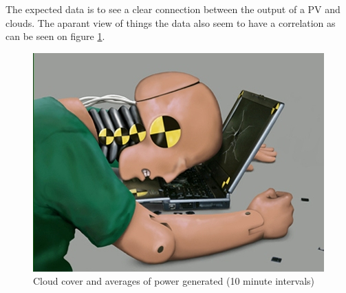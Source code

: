 The expected data is to see a clear connection between the output of a
PV and clouds\citep{southafrica}.  The aparant view of things the data
also seem to have a correlation as can be seen on figure \ref{fig:cloudsAndPower}.

\begin{figure}[h]
  \centering
  \includegraphics{dummy.jpg}
  \caption{Cloud cover and averages of power generated (10 minute intervals)}
  \label{fig:cloudsAndPower}
\end{figure}

